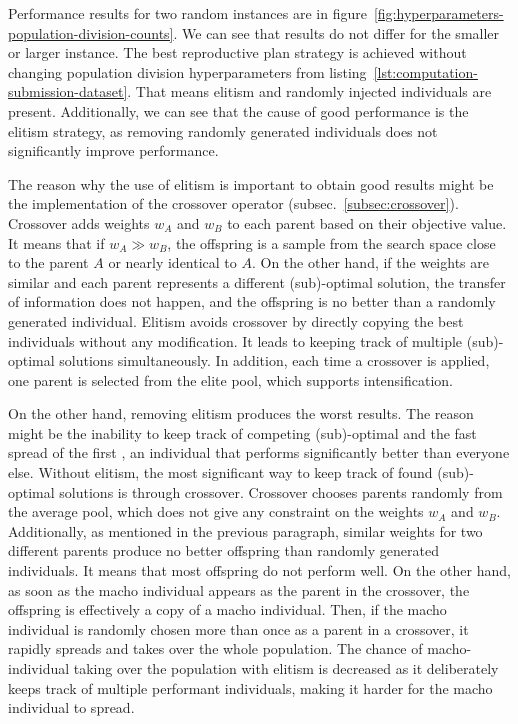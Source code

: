 Performance results for two random instances are in figure~\ref{fig:hyperparameters-population-division-counts}.
We can see that results do not differ for the smaller or larger instance.
The best reproductive plan strategy is achieved without changing population division hyperparameters from listing~\ref{lst:computation-submission-dataset}.
That means elitism and randomly injected individuals are present.
Additionally, we can see that the cause of good performance is the elitism strategy,
as removing randomly generated individuals does not significantly improve performance.

The reason why the use of elitism is important to obtain good results might be the implementation of the crossover operator (subsec.~\ref{subsec:crossover}).
Crossover adds weights $w_A$ and $w_B$ to each parent based on their objective value.
It means that if $w_A \gg w_B$, the offspring is a sample from the search space close to the parent $A$ or nearly identical to $A$.
On the other hand, if the weights are similar and each parent represents a different (sub)-optimal solution,
the transfer of information does not happen, and the offspring is no better than a randomly generated individual.
Elitism avoids crossover by directly copying the best individuals without any modification.
It leads to keeping track of multiple (sub)-optimal solutions simultaneously.
In addition, each time a crossover is applied, one parent is selected from the elite pool,
which supports intensification.

On the other hand, removing elitism produces the worst results.
The reason might be the inability to keep track of competing (sub)-optimal and the fast spread of the first
, an individual that performs significantly better than everyone else.
Without elitism, the most significant way to keep track of found (sub)-optimal solutions is through crossover.
Crossover chooses parents randomly from the average pool, which does not give any constraint on the weights $w_A$ and $w_B$.
Additionally, as mentioned in the previous paragraph, similar weights for two different parents produce no better offspring than randomly generated individuals.
It means that most offspring do not perform well.
On the other hand, as soon as the macho individual appears as the parent in the crossover, the offspring is effectively a copy of a macho individual.
Then, if the macho individual is randomly chosen more than once as a parent in a crossover, it rapidly spreads and takes over the whole population.
The chance of macho-individual taking over the population with elitism is decreased as it deliberately keeps track of multiple performant individuals,
making it harder for the macho individual to spread.

